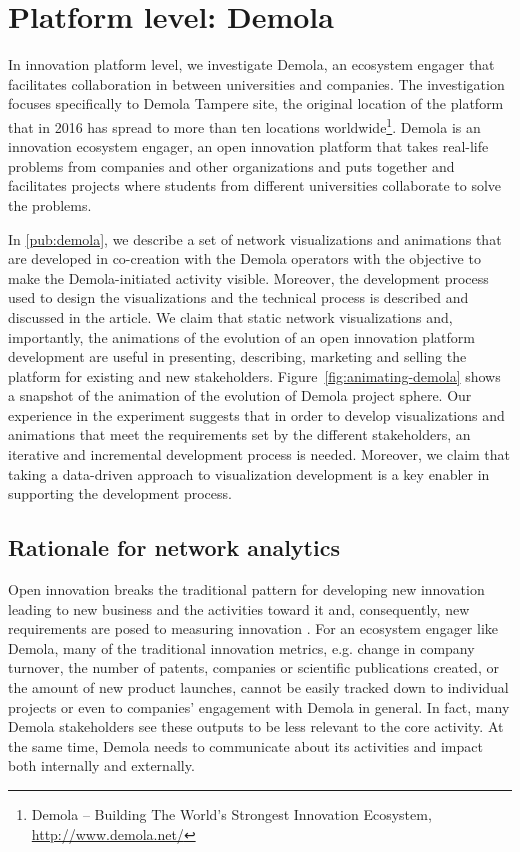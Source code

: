 \endgroup

\section{Platform level: Demola}

In innovation platform level, we investigate Demola, an ecosystem engager that facilitates collaboration in between universities and companies. The investigation focuses specifically to Demola Tampere site, the original location of the platform that in 2016 has spread to more than ten locations worldwide\footnote{Demola – Building The World’s Strongest Innovation Ecosystem, \url{http://www.demola.net/}}. Demola is an innovation ecosystem engager, an open innovation platform that takes real-life problems from companies and other organizations and puts together and facilitates projects where students from different universities collaborate to solve the problems. 

In \ref{pub:demola}, we \citep{Huhtamaki2013ProcessDemola} describe a set of network visualizations and animations that are developed in co-creation with the Demola operators with the objective to make the Demola-initiated activity visible. Moreover, the development process used to design the visualizations and the technical process is described and discussed in the article. We claim that static network visualizations and, importantly, the animations of the evolution of an open innovation platform development are useful in presenting, describing, marketing and selling the platform for existing and new stakeholders. Figure~\ref{fig:animating-demola} shows a snapshot of the animation of the evolution of Demola project sphere. Our experience in the experiment suggests that in order to develop visualizations and animations that meet the requirements set by the different stakeholders, an iterative and incremental development process is needed. Moreover, we claim that taking a data-driven approach to visualization development is a key enabler in supporting the development process.

\subsection{Rationale for network analytics}

Open innovation breaks the traditional pattern for developing new innovation leading to new business and the activities toward it and, consequently, new requirements are posed to measuring innovation \citep[cf.][]{Still2012ParadigmDigital}. For an ecosystem engager like Demola, many of the traditional innovation metrics, e.g. change in company turnover, the number of patents, companies or scientific publications created, or the amount of new product launches, cannot be easily tracked down to individual projects or even to companies' engagement with Demola in general. In fact, many Demola stakeholders see these outputs to be less relevant to the core activity. At the same time, Demola needs to communicate about its activities and impact both internally and externally.

